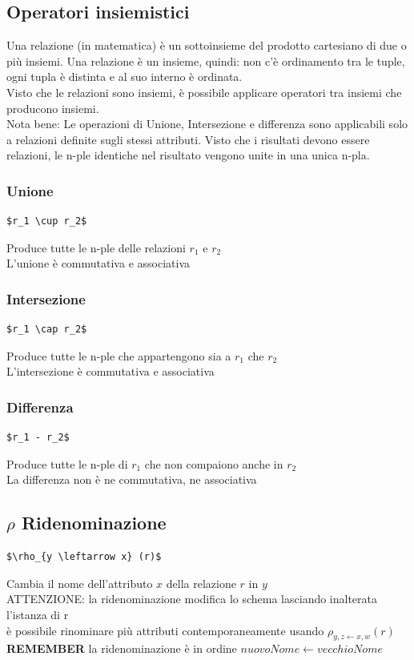 \documentclass[12pt, a4paper, openany]{book}
\begin{document}
\subsection{Operatori insiemistici}
Una relazione (in matematica) è un sottoinsieme del prodotto cartesiano di due o più insiemi.
Una relazione è un insieme, quindi: non c'è ordinamento tra le tuple, ogni tupla è distinta e al suo interno è ordinata.
\\ Visto che le relazioni sono insiemi, è possibile applicare operatori tra insiemi che producono insiemi.
\\Nota bene: Le operazioni di Unione, Intersezione e differenza sono applicabili solo a relazioni definite sugli stessi attributi.
Visto che i risultati devono essere relazioni, le n-ple identiche nel risultato vengono unite in una unica n-pla.
\subsubsection*{Unione}
\begin{lstlisting}[mathescape=true]
$r_1 \cup r_2$
\end{lstlisting}
Produce tutte le n-ple delle relazioni $r_1$ e $r_2$
\\L'unione è commutativa e associativa
\subsubsection*{Intersezione}
\begin{lstlisting}[mathescape=true]
$r_1 \cap r_2$
\end{lstlisting}
Produce tutte le n-ple che appartengono sia a $r_1$ che $r_2$
\\L'intersezione è commutativa e associativa
\subsubsection*{Differenza}
\begin{lstlisting}[mathescape=true]
$r_1 - r_2$ 
\end{lstlisting}
Produce tutte le n-ple di $r_1$ che non compaiono anche in $r_2$
\\La differenza non è ne commutativa, ne associativa

\subsection{$\rho$ Ridenominazione}
\begin{lstlisting}[mathescape=true]
$\rho_{y \leftarrow x} (r)$
\end{lstlisting}
Cambia il nome dell'attributo $x$ della relazione $r$ in $y$
\\ATTENZIONE: la ridenominazione modifica lo schema lasciando inalterata l'istanza di r
\\è possibile rinominare più attributi contemporaneamente usando $\rho_{y,z \leftarrow x,w} (r)$
\\\textbf{REMEMBER} la ridenominazione è in ordine $nuovoNome \leftarrow vecchioNome$ 
\end{document}
